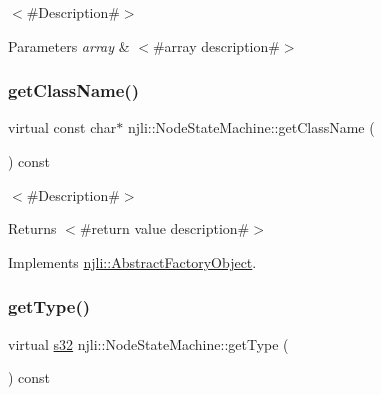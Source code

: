 $<$\#\+Description\#$>$


\begin{DoxyParams}{Parameters}
{\em array} & $<$\#array description\#$>$ \\
\hline
\end{DoxyParams}
\mbox{\label{classnjli_1_1_node_state_machine_a2b3063546fe0cadb8fa59006b9f68913}} 
\subsubsection{\texorpdfstring{get\+Class\+Name()}{getClassName()}}
{\footnotesize\ttfamily virtual const char$\ast$ njli\+::\+Node\+State\+Machine\+::get\+Class\+Name (\begin{DoxyParamCaption}{ }\end{DoxyParamCaption}) const\hspace{0.3cm}{\ttfamily [virtual]}}

$<$\#\+Description\#$>$

\begin{DoxyReturn}{Returns}
$<$\#return value description\#$>$ 
\end{DoxyReturn}


Implements \mbox{\hyperlink{classnjli_1_1_abstract_factory_object_af4151e41b80d5bc3fc42822c67fc2278}{njli\+::\+Abstract\+Factory\+Object}}.

\mbox{\label{classnjli_1_1_node_state_machine_a5d31328eae2661bf79eeddac3f614dbe}} 
\subsubsection{\texorpdfstring{get\+Type()}{getType()}}
{\footnotesize\ttfamily virtual \mbox{\hyperlink{_util_8h_aa62c75d314a0d1f37f79c4b73b2292e2}{s32}} njli\+::\+Node\+State\+Machine\+::get\+Type (\begin{DoxyParamCaption}{ }\end{DoxyParamCaption}) const\hspace{0.3cm}{\ttfamily [virtual]}}

